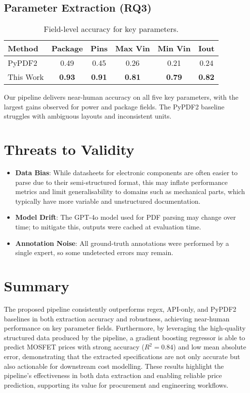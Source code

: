\subsection{Parameter Extraction (RQ3)}
\begin{table}[H]
\centering
\caption{Field-level accuracy for key parameters.}
\label{tab:fields}
\begin{tabular}{lccccc}
\toprule
Method & Package & Pins & Max Vin & Min Vin & Iout \\
\midrule
PyPDF2    & 0.49 & 0.45 & 0.26 & 0.21 & 0.24 \\
This Work      & \textbf{0.93} & \textbf{0.91} & \textbf{0.81} & \textbf{0.79} & \textbf{0.82} \\
\bottomrule
\end{tabular}
\end{table}
Our pipeline delivers near-human accuracy on all five key parameters, with the largest gains observed for power and package fields. The PyPDF2 baseline struggles with ambiguous layouts and inconsistent units.

\section{Threats to Validity}
\begin{itemize}
  \item \textbf{Data Bias}: While datasheets for electronic components are often easier to parse due to their semi-structured format, this may inflate performance metrics and limit generalisability to domains such as mechanical parts, which typically have more variable and unstructured documentation.
  \item \textbf{Model Drift}: The GPT-4o model used for PDF parsing may change over time; to mitigate this, outputs were cached at evaluation time.
  \item \textbf{Annotation Noise}: All ground-truth annotations were performed by a single expert, so some undetected errors may remain.
\end{itemize}



\section{Summary}
The proposed pipeline consistently outperforms regex, API-only, and PyPDF2 baselines in both extraction accuracy and robustness, achieving near-human performance on key parameter fields. Furthermore, by leveraging the high-quality structured data produced by the pipeline, a gradient boosting regressor is able to predict MOSFET prices with strong accuracy ($R^2 = 0.84$) and low mean absolute error, demonstrating that the extracted specifications are not only accurate but also actionable for downstream cost modelling. These results highlight the pipeline's effectiveness in both data extraction and enabling reliable price prediction, supporting its value for procurement and engineering workflows.